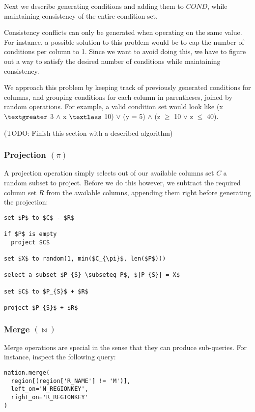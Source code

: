 \documentclass[10pt, twocolumn]{article}
\begin{document}
\spacing
\noindent
Next we describe generating conditions and adding them to $COND$, while maintaining consistency of the entire condition set.

\spacing
\noindent
Consistency conflicts can only be generated when operating on the same value. For instance, a possible solution to this problem would be to cap the number of conditions per column to 1. Since we want to avoid doing this, we have to figure out a way to satisfy the desired number of conditions while maintaining consistency.

\spacing
\noindent
We approach this problem by keeping track of previously generated conditions for columns, and grouping conditions for each column in parentheses, joined by random operations. For example, a valid condition set would look like (x $\textgreater$ 3 $\land$ x $\textless$ 10) $\lor$ (y = 5) $\land$ (z $\geq$ 10 $\lor$ z $\leq$ 40).

\spacing
\noindent
(TODO: Finish this section with a described algorithm)

\subsubsection*{Projection $(\pi)$}

A projection operation simply selects out of our available columns set $C$ a random subset to project. Before we do this however, we subtract the required column set $R$ from the available columns, appending them right before generating the projection:

\spacing
\begin{lstlisting}
set $P$ to $C$ - $R$

if $P$ is empty
  project $C$

set $X$ to random(1, min($C_{\pi}$, len($P$)))

select a subset $P_{S} \subseteq P$, $|P_{S}| = X$

set $C$ to $P_{S}$ + $R$

project $P_{S}$ + $R$
\end{lstlisting}

\subsubsection*{Merge $(\bowtie)$}

Merge operations are special in the sense that they can produce sub-queries. For instance, inspect the following query:

\begin{verbatim}
nation.merge(
  region[(region['R_NAME'] != 'M')],
  left_on='N_REGIONKEY',
  right_on='R_REGIONKEY'
)
\end{verbatim}
\end{document}
